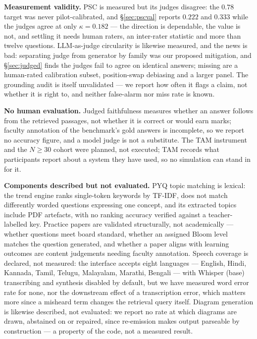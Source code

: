 \documentclass[conference]{IEEEtran}
\begin{document}
\textbf{Measurement validity.} PSC is measured but its judges disagree: the
$0.78$ target was never pilot-calibrated, and §\ref{sec:pscval} reports $0.222$
and $0.333$ while the judges agree at only $\kappa = 0.182$ --- the direction is
dependable, the value is not, and settling it needs human raters, an inter-rater
statistic and more than twelve questions. LLM-as-judge circularity is likewise
measured, and the news is bad: separating judge from generator by family was our
proposed mitigation, and §\ref{sec:judged} finds the judges fail to agree on
identical answers; missing are a human-rated calibration subset, position-swap
debiasing and a larger panel. The grounding audit is itself unvalidated --- we
report how often it flags a claim, not whether it is right to, and neither
false-alarm nor miss rate is known.

\textbf{No human evaluation.} Judged faithfulness measures whether an answer
follows from the retrieved passages, not whether it is correct or would earn
marks; faculty annotation of the benchmark's gold answers is incomplete, so we
report no accuracy figure, and a model judge is not a substitute. The TAM
instrument~\cite{davis1989} and the $N \geq 30$ cohort were planned, not
executed; TAM records what participants report about a system they have used, so
no simulation can stand in for it.

\textbf{Components described but not evaluated.} PYQ topic matching is lexical:
the trend engine ranks single-token keywords by TF-IDF, does not match
differently worded questions expressing one concept, and its extracted topics
include PDF artefacts, with no ranking accuracy verified against a
teacher-labelled key. Practice papers are validated structurally, not
academically --- whether questions meet board standard, whether an assigned
Bloom level matches the question generated, and whether a paper aligns with
learning outcomes are content judgements needing faculty annotation. Speech
coverage is declared, not measured: the interface accepts eight languages ---
English, Hindi, Kannada, Tamil, Telugu, Malayalam, Marathi, Bengali --- with
Whisper (base) transcribing and synthesis disabled by default, but we have
measured word error rate for none, nor the downstream effect of a transcription
error, which matters more since a misheard term changes the retrieval query
itself. Diagram generation is likewise described, not evaluated: we report no
rate at which diagrams are drawn, abstained on or repaired, since re-emission
makes output parseable by construction --- a property of the code, not a
measured result.
\end{document}
